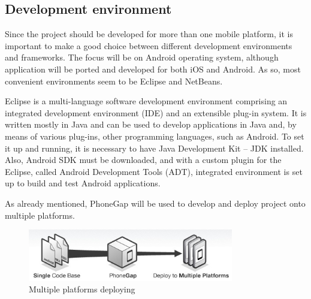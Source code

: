 \pagebreak
\subsection{Development environment}

Since the project should be developed for more than one mobile platform, it is important to make a good choice between different development environments and frameworks. The focus will be on Android operating system, although application will be ported and developed for both iOS and Android.
As so, most convenient environments seem to be Eclipse and NetBeans.\newline

Eclipse is a multi-language software development environment comprising an integrated development environment (IDE) and an extensible plug-in system. It is written mostly in Java and can be used to develop applications in Java and, by means of various plug-ins, other programming languages, such as Android. 
To set it up and running, it is necessary to have Java Development Kit – JDK installed. Also, Android SDK must be downloaded, and with a custom plugin for the Eclipse, called Android Development Tools (ADT), integrated environment is set up to build and test Android applications.\newline

As already mentioned, PhoneGap will be used to develop and deploy project onto multiple platforms.\newline
\begin{figure}[phonegap]
	\centering
	\includegraphics[width=0.8\textwidth]{prestudy/development_environment/PhoneGap.jpg}
	\caption{Multiple platforms deploying}
	\label{fig:usecase}
\end{figure}
